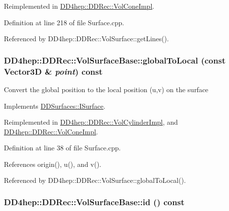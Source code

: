 Reimplemented in \hyperlink{class_d_d4hep_1_1_d_d_rec_1_1_vol_cone_impl_ae644bf91eb0b033f16ac4d89d00dd080}{DD4hep::DDRec::VolConeImpl}.

Definition at line 218 of file Surface.cpp.

Referenced by DD4hep::DDRec::VolSurface::getLines().\hypertarget{class_d_d4hep_1_1_d_d_rec_1_1_vol_surface_base_aa5a6ee5edfdab58a13282beaef1331d4}{
\subsubsection[{globalToLocal}]{ DD4hep::DDRec::VolSurfaceBase::globalToLocal (const {\bf Vector3D} \& {\em point}) const}}
\label{class_d_d4hep_1_1_d_d_rec_1_1_vol_surface_base_aa5a6ee5edfdab58a13282beaef1331d4}
Convert the global position to the local position (u,v) on the surface 

Implements \hyperlink{class_d_d_surfaces_1_1_i_surface_a0d6db86d4871584a9e72ac6018229737}{DDSurfaces::ISurface}.

Reimplemented in \hyperlink{class_d_d4hep_1_1_d_d_rec_1_1_vol_cylinder_impl_a66cd91cef2963fa1d1495d4764e2d94f}{DD4hep::DDRec::VolCylinderImpl}, and \hyperlink{class_d_d4hep_1_1_d_d_rec_1_1_vol_cone_impl_a427ac9a8bccf658a2161b21d6ae1267f}{DD4hep::DDRec::VolConeImpl}.

Definition at line 38 of file Surface.cpp.

References origin(), u(), and v().

Referenced by DD4hep::DDRec::VolSurface::globalToLocal().\hypertarget{class_d_d4hep_1_1_d_d_rec_1_1_vol_surface_base_ab6e54400eb78cdb78e8f4c53063f863b}{
\subsubsection[{id}]{ DD4hep::DDRec::VolSurfaceBase::id () const}}
\label{class_d_d4hep_1_1_d_d_rec_1_1_vol_surface_base_ab6e54400eb78cdb78e8f4c53063f863b}


